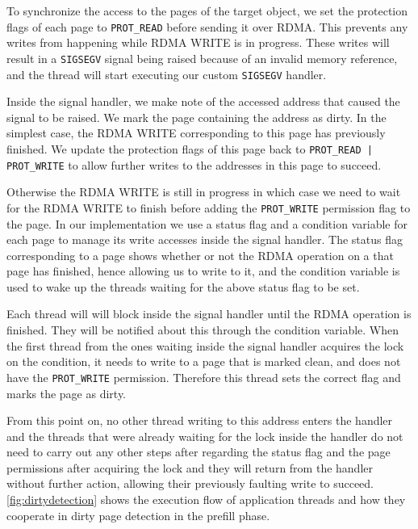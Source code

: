 To synchronize the access to the pages of the target object,
we set the protection flags of each page to \texttt{PROT\_READ} before sending
it over RDMA. This prevents any writes from happening while RDMA WRITE
is in progress. These writes will result in a \texttt{SIGSEGV} signal being
raised because of an invalid memory reference, and the thread will start
executing our custom \texttt{SIGSEGV} handler.

Inside the signal handler, we make note of the accessed address that
caused the signal to be raised. We mark the page containing the address as
dirty. In the simplest case, the RDMA WRITE corresponding to this page has
previously finished. We update the protection flags of this page back
to \texttt{PROT\_READ | PROT\_WRITE}
to allow further writes to the addresses in this page to succeed.

Otherwise the RDMA WRITE is still in progress in which case we need to wait for the
RDMA WRITE to finish before adding the \texttt{PROT\_WRITE} permission flag to
the page. In our
implementation we use a status flag and a condition variable for each page
to manage its write accesses inside the signal handler. The status flag
corresponding to a page shows whether or not the RDMA operation on a that page
has finished, hence allowing us to write to it, and the condition variable
is used to wake up the threads waiting for the above status flag to be set.

Each thread will will block inside the signal handler until
the RDMA operation is finished. They will be notified about this through the
condition variable. When the first thread from the ones waiting inside the
signal handler acquires the lock on the condition, it needs to write to a
page that is marked clean, and does not have the \texttt{PROT\_WRITE}
permission. Therefore this thread sets the correct flag and marks the page as
dirty.

From this point on, no other thread writing to this address enters the
handler and the threads that were already waiting for the lock inside the
handler do not need
to carry out any other steps after regarding the status flag and the page permissions
after acquiring the lock and they will
return from the handler without further action, allowing their previously
faulting write to succeed.
\autoref{fig:dirtydetection} shows the execution flow of application threads
and how they cooperate in dirty page detection in the prefill phase.

